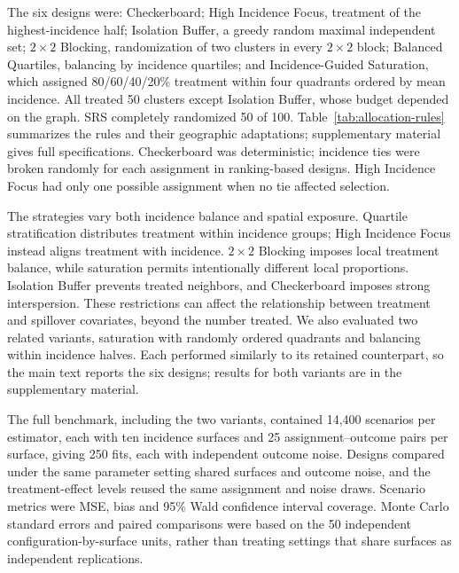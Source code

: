 \documentclass[Afour,sagev,times]{sagej}
\begin{document}
The six designs were: Checkerboard; High Incidence Focus, treatment of the highest-incidence half; Isolation Buffer, a greedy random maximal independent set; $2\times2$ Blocking, randomization of two clusters in every $2\times2$ block; Balanced Quartiles, balancing by incidence quartiles; and Incidence-Guided Saturation, which assigned 80/60/40/20\% treatment within four quadrants ordered by mean incidence. All treated 50 clusters except Isolation Buffer, whose budget depended on the graph. SRS completely randomized 50 of 100. Table~\ref{tab:allocation-rules} summarizes the rules and their geographic adaptations; supplementary material gives full specifications. Checkerboard was deterministic; incidence ties were broken randomly for each assignment in ranking-based designs. High Incidence Focus had only one possible assignment when no tie affected selection.
\ifctjreading
\CTJDesignTable
\fi

The strategies vary both incidence balance and spatial exposure. Quartile stratification distributes treatment within incidence groups; High Incidence Focus instead aligns treatment with incidence. $2\times2$ Blocking imposes local treatment balance, while saturation permits intentionally different local proportions. Isolation Buffer prevents treated neighbors, and Checkerboard imposes strong interspersion. These restrictions can affect the relationship between treatment and spillover covariates, beyond the number treated. We also evaluated two related variants, saturation with randomly ordered quadrants and balancing within incidence halves. Each performed similarly to its retained counterpart, so the main text reports the six designs; results for both variants are in the supplementary material.

The full benchmark, including the two variants, contained 14,400 scenarios per estimator, each with ten incidence surfaces and 25 assignment--outcome pairs per surface, giving 250 fits, each with independent outcome noise. Designs compared under the same parameter setting shared surfaces and outcome noise, and the treatment-effect levels reused the same assignment and noise draws. Scenario metrics were MSE, bias and 95\% Wald confidence interval coverage. Monte Carlo standard errors and paired comparisons were based on the 50 independent configuration-by-surface units, rather than treating settings that share surfaces as independent replications.
\end{document}
